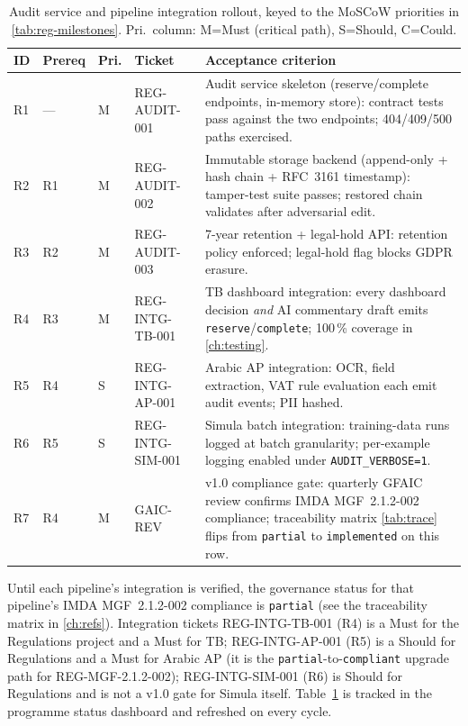 \documentclass[11pt,a4paper,twoside]{report}
\begin{document}
\begin{table}[htbp]
\centering
\caption{Audit service and pipeline integration rollout, keyed to
the MoSCoW priorities in \cref{tab:reg-milestones}. Pri.\ column:
M=Must (critical path), S=Should, C=Could.}
\label{tab:identity-rollout}
\footnotesize
\begin{tabularx}{\linewidth}{@{}l l l l X@{}}
\toprule
\textbf{ID} & \textbf{Prereq} & \textbf{Pri.} & \textbf{Ticket} & \textbf{Acceptance criterion} \\ \midrule
R1 & ---        & M & REG-AUDIT-001   & Audit service skeleton (reserve/complete endpoints, in-memory store): contract tests pass against the two endpoints; 404/409/500 paths exercised. \\
R2 & R1         & M & REG-AUDIT-002   & Immutable storage backend (append-only + hash chain + RFC~3161 timestamp): tamper-test suite passes; restored chain validates after adversarial edit. \\
R3 & R2         & M & REG-AUDIT-003   & 7-year retention + legal-hold API: retention policy enforced; legal-hold flag blocks GDPR erasure. \\
R4 & R3         & M & REG-INTG-TB-001 & TB dashboard integration: every dashboard decision \emph{and} AI commentary draft emits \texttt{reserve}/\texttt{complete}; 100\,\% coverage in \cref{ch:testing}. \\
R5 & R4         & S & REG-INTG-AP-001 & Arabic AP integration: OCR, field extraction, VAT rule evaluation each emit audit events; PII hashed. \\
R6 & R5         & S & REG-INTG-SIM-001 & Simula batch integration: training-data runs logged at batch granularity; per-example logging enabled under \texttt{AUDIT\_VERBOSE=1}. \\
R7 & R4         & M & GAIC-REV        & v1.0 compliance gate: quarterly GFAIC review confirms IMDA MGF~2.1.2-002 compliance; traceability matrix \cref{tab:trace} flips from \texttt{partial} to \texttt{implemented} on this row. \\
\bottomrule
\end{tabularx}
\end{table}

\noindent
Until each pipeline's integration is verified, the governance status
for that pipeline's IMDA MGF~2.1.2-002 compliance is \texttt{partial}
(see the traceability matrix in \cref{ch:refs}). Integration tickets
REG-INTG-TB-001 (R4) is a Must for the Regulations project and a Must
for TB; REG-INTG-AP-001 (R5) is a Should for Regulations and a Must
for Arabic AP (it is the \texttt{partial}-to-\texttt{compliant}
upgrade path for REG-MGF-2.1.2-002); REG-INTG-SIM-001 (R6) is Should
for Regulations and is not a v1.0 gate for Simula itself.
Table~\ref{tab:identity-rollout} is tracked in the programme status
dashboard and refreshed on every cycle.
\end{document}

